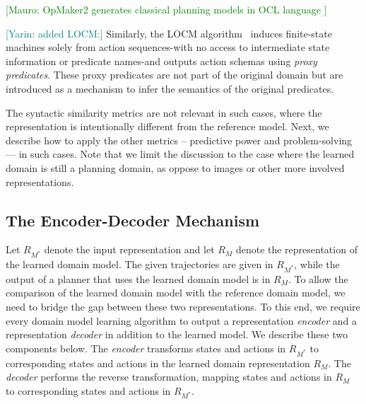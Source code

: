 \documentclass{article}
\theoremstyle{definition}
\theoremstyle{remark}
\newcommand{\realm}{\ensuremath{M^*}\xspace}
\newcommand{\mauro}[1]{{\textcolor{green}{[Mauro: #1]}}}
\newcommand{\yarin}[1]{{\textcolor{teal}{[Yarin: #1]}}}
\begin{document}
\mauro{OpMaker2 generates classical planning models in OCL language \cite{mccluskey2010action}}

\yarin{added LOCM:}
Similarly, the LOCM algorithm~\citep{cresswell2013acquiring} induces finite-state machines solely from action sequences-with no access to intermediate state information or predicate names-and outputs action schemas using \emph{proxy predicates}. 
These proxy predicates are not part of the original domain but are introduced as a mechanism to infer the semantics of the original predicates. 


The syntactic similarity metrics are not relevant in such cases, where the representation is intentionally different from the reference model. Next, we describe how to apply the other metrics -- predictive power and problem-solving --- in such cases. 
Note that we limit the discussion to the case where the learned domain is still a planning domain, as oppose to images or other more involved representations. 

\subsection{The Encoder-Decoder Mechanism}
Let $R_{\realm}$ denote the input representation and let $R_M$ denote the representation of the learned domain model. 
The given trajectories are given in $R_{\realm}$, 
while the output of a planner that uses the learned domain model is in $R_M$. 
To allow the comparison of the learned domain model with the reference domain model, we need to bridge the gap between these two representations. 
To this end, we require every domain model learning algorithm to output 
a representation \emph{encoder} and a representation \emph{decoder} in addition to the learned model. We describe these two components below.  
The \emph{encoder} transforms states and actions in $R_{\realm}$ to corresponding states and actions in the learned domain representation $R_M$. 
The \emph{decoder} performs the reverse transformation, mapping states and actions in $R_M$ to corresponding states and actions in $R_\realm$.
\end{document}
